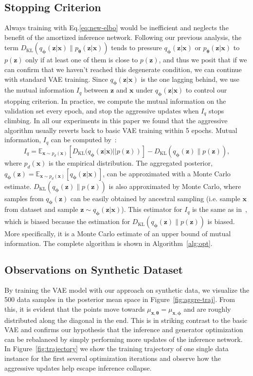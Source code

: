 \documentclass{article} \usepackage{iclr2019_conference,times}
\def\rvx{{\mathbf{x}}}
\def\rvz{{\mathbf{z}}}
\def\vtheta{{\bm{\theta}}}
\def\vphi{{\bm{\phi}}}
\newcommand{\E}{\mathbb{E}}
\newcommand{\KL}{D_{\mathrm{KL}}}
\newcommand{\Ep}{\E_{\rvx\sim p_d(\rvx)}}
\newcommand{\qzx}{q_{\vphi}(\rvz|\rvx)}
\newcommand{\pzx}{p_{\vtheta}(\rvz|\rvx)}
\newcommand{\pdx}{p_d(\rvx)}
\newcommand{\pz}{p(\rvz)}
\newcommand{\qz}{q_{\vphi}(\rvz)}
\newcommand{\z}{\rvz}
\newcommand{\x}{\rvx}
\newcommand{\mut}{\mu_{\x, \vtheta}}
\newcommand{\mup}{\mu_{\x, \vphi}}
\begin{document}
\subsection{Stopping Criterion}
\label{sec:stop}
Always training with Eq.\ref{eq:new-elbo} would be inefficient and neglects the benefit of the amortized inference network.
Following our previous analysis, the term $\KL(\qzx \| \pzx)$ tends to pressure $\qzx$ or $\pzx$ to $\pz$ only if at least one of them is close to $\pz$, and thus we posit that if we can confirm that we haven't reached this degenerate condition, we can continue with standard VAE training.
Since $\qzx$ is the one lagging behind, we use the mutual information $I_q$ between $\z$ and $\x$ under $\qzx$ to control our stopping criterion.
In practice, we compute the mutual information on the validation set every epoch, and stop the aggressive updates when $I_q$ stops climbing. In all our experiments in this paper we found that the aggressive algorithm usually reverts back to basic VAE training within 5 epochs.
Mutual information, $I_q$ can be computed by~\citep{hoffman2016elbo}:
\begin{equation}
\label{eq:mi}
I_q = \Ep[\KL(\qzx || \pz)] - \KL(\qz \| \pz),
\end{equation}
where $\pdx$ is the empirical distribution. The aggregated posterior, $\qz=\Ep[\qzx]$, can be approximated with a Monte Carlo estimate.
$\KL(\qz \| \pz)$ is also approximated by Monte Carlo, where samples from $\qz$ can be easily obtained by ancestral sampling (i.e. sample $\x$ from dataset and sample $\z \sim \qzx$). This estimator for $I_q$ is the same as in~\citep{dieng2018avoiding}, which is biased because the estimation for $\KL(\qz \| \pz)$ is biased. More specifically, it is a Monte Carlo estimate of an upper bound of mutual information. The complete algorithm is shown in Algorithm~\ref{alg:opt}.

\subsection{Observations on Synthetic Dataset}
By training the VAE model with our approach on synthetic data, we visualize the 500 data samples in the posterior mean space in Figure~\ref{fig:aggre-traj}.
From this, it is evident that the points move towards $\mut = \mup$ and are roughly distributed along the diagonal in the end. This is in striking contrast to the basic VAE and confirms our hypothesis that the inference and generator optimization can be rebalanced by simply performing more updates of the inference network. In Figure~\ref{fig:trajectory} we show the training trajectory of one single data instance for the first several optimization iterations and observe how the aggressive updates help escape inference collapse.
\end{document}
